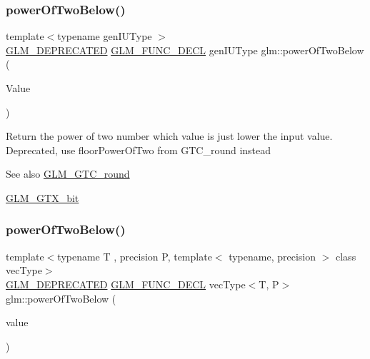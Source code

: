 \subsubsection{\texorpdfstring{powerOfTwoBelow()}{powerOfTwoBelow()}\hspace{0.1cm}{\footnotesize\ttfamily [1/2]}}
{\footnotesize\ttfamily template$<$typename gen\+I\+U\+Type $>$ \\
\mbox{\hyperlink{setup_8hpp_a8edfb48cdc249a3ee48406bf179023dc}{G\+L\+M\+\_\+\+D\+E\+P\+R\+E\+C\+A\+T\+ED}} \mbox{\hyperlink{setup_8hpp_ab2d052de21a70539923e9bcbf6e83a51}{G\+L\+M\+\_\+\+F\+U\+N\+C\+\_\+\+D\+E\+CL}} gen\+I\+U\+Type glm\+::power\+Of\+Two\+Below (\begin{DoxyParamCaption}\item[{gen\+I\+U\+Type}]{Value }\end{DoxyParamCaption})}

Return the power of two number which value is just lower the input value. Deprecated, use floor\+Power\+Of\+Two from G\+T\+C\+\_\+round instead

\begin{DoxySeeAlso}{See also}
\mbox{\hyperlink{group__gtc__round}{G\+L\+M\+\_\+\+G\+T\+C\+\_\+round}} 

\mbox{\hyperlink{group__gtx__bit}{G\+L\+M\+\_\+\+G\+T\+X\+\_\+bit}} 
\end{DoxySeeAlso}
\mbox{\label{group__gtx__bit_gae33bb1ca2b55846b23a0f0796a679195}} 
\subsubsection{\texorpdfstring{powerOfTwoBelow()}{powerOfTwoBelow()}\hspace{0.1cm}{\footnotesize\ttfamily [2/2]}}
{\footnotesize\ttfamily template$<$typename T , precision P, template$<$ typename, precision $>$ class vec\+Type$>$ \\
\mbox{\hyperlink{setup_8hpp_a8edfb48cdc249a3ee48406bf179023dc}{G\+L\+M\+\_\+\+D\+E\+P\+R\+E\+C\+A\+T\+ED}} \mbox{\hyperlink{setup_8hpp_ab2d052de21a70539923e9bcbf6e83a51}{G\+L\+M\+\_\+\+F\+U\+N\+C\+\_\+\+D\+E\+CL}} vec\+Type$<$T, P$>$ glm\+::power\+Of\+Two\+Below (\begin{DoxyParamCaption}\item[{vec\+Type$<$ T, P $>$ const \&}]{value }\end{DoxyParamCaption})}

